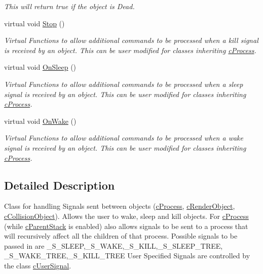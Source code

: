 \begin{DoxyCompactItemize}
\begin{DoxyCompactList}\small\item\em This will return true if the object is Dead. \end{DoxyCompactList}\item 
\hypertarget{classc_signal_a560b2a6f66d35ac165639b6a54b5ccfb}{
virtual void \hyperlink{classc_signal_a560b2a6f66d35ac165639b6a54b5ccfb}{Stop} ()}
\label{classc_signal_a560b2a6f66d35ac165639b6a54b5ccfb}

\begin{DoxyCompactList}\small\item\em Virtual Functions to allow additional commands to be processed when a kill signal is received by an object. This can be user modified for classes inheriting \hyperlink{classc_process}{cProcess}. \end{DoxyCompactList}\item 
\hypertarget{classc_signal_a35df6ce0c2350bf9cf9b6ce6718e6bcf}{
virtual void \hyperlink{classc_signal_a35df6ce0c2350bf9cf9b6ce6718e6bcf}{OnSleep} ()}
\label{classc_signal_a35df6ce0c2350bf9cf9b6ce6718e6bcf}

\begin{DoxyCompactList}\small\item\em Virtual Functions to allow additional commands to be processed when a sleep signal is received by an object. This can be user modified for classes inheriting \hyperlink{classc_process}{cProcess}. \end{DoxyCompactList}\item 
\hypertarget{classc_signal_ac65d437205fc1b578f75ca2edf79683f}{
virtual void \hyperlink{classc_signal_ac65d437205fc1b578f75ca2edf79683f}{OnWake} ()}
\label{classc_signal_ac65d437205fc1b578f75ca2edf79683f}

\begin{DoxyCompactList}\small\item\em Virtual Functions to allow additional commands to be processed when a wake signal is received by an object. This can be user modified for classes inheriting \hyperlink{classc_process}{cProcess}. \end{DoxyCompactList}\end{DoxyCompactItemize}


\subsection{Detailed Description}
Class for handling Signals sent between objects (\hyperlink{classc_process}{cProcess}, \hyperlink{classc_render_object}{cRenderObject}, \hyperlink{classc_collision_object}{cCollisionObject}). Allows the user to wake, sleep and kill objects. For \hyperlink{classc_process}{cProcess} (while \hyperlink{classc_parent_stack}{cParentStack} is enabled) also allows signals to be sent to a process that will recursively affect all the children of that process. Possible signals to be passed in are \_\-S\_\-SLEEP,\_\-S\_\-WAKE,\_\-S\_\-KILL,\_\-S\_\-SLEEP\_\-TREE, \_\-S\_\-WAKE\_\-TREE,\_\-S\_\-KILL\_\-TREE User Specified Signals are controlled by the class \hyperlink{classc_user_signal}{cUserSignal}. 